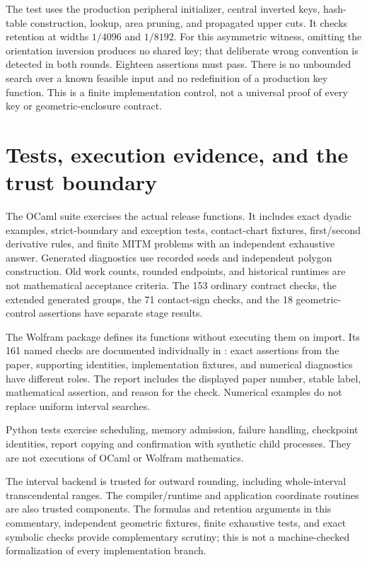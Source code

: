 \documentclass[11pt,a4paper]{article}
\newcommand{\code}[1]{\texttt{\detokenize{#1}}}
\theoremstyle{remark}\newtheorem*{contract}{Implementation contract}\newtheorem*{auditnote}{Audit note}
\begin{document}
The test uses the production peripheral initializer, central inverted
keys, hash-table construction, lookup, area pruning, and propagated
upper cuts. It checks retention at widths $1/4096$ and $1/8192$.
For this asymmetric witness, omitting the orientation inversion produces
no shared key; that deliberate wrong convention is detected in both
rounds. Eighteen assertions must pass. There is no unbounded search over
a known feasible input and no redefinition of a production key function.
This is a finite implementation control, not a universal proof of every
key or geometric-enclosure contract.

\section{Tests, execution evidence, and the trust boundary}

The OCaml suite exercises the actual release functions. It includes exact
dyadic examples, strict-boundary and exception tests, contact-chart fixtures,
first/second derivative rules, and finite MITM problems with an independent
exhaustive answer. Generated diagnostics use recorded seeds and independent
polygon construction. Old work counts, rounded endpoints, and historical
runtimes are not mathematical acceptance criteria. The 153 ordinary contract
checks, the extended generated groups, the 71 contact-sign checks, and
the 18 geometric-control assertions have separate stage results.

The Wolfram package defines its functions without executing them on import.
Its 161 named checks are documented individually in
\code{docs/WOLFRAM_CHECKS.md}: exact assertions from the paper, supporting
identities, implementation fixtures, and numerical diagnostics have different
roles. The report includes the displayed paper number, stable label,
mathematical assertion, and reason for the check. Numerical examples do not
replace uniform interval searches.

Python tests exercise scheduling, memory admission, failure handling,
checkpoint identities, report copying and confirmation with synthetic child
processes. They are not executions of OCaml or Wolfram mathematics.

The interval backend is trusted for outward rounding, including
whole-interval transcendental ranges. The compiler/runtime and application
coordinate routines are also trusted components. The formulas and retention
arguments in this commentary, independent geometric fixtures, finite
exhaustive tests, and exact symbolic checks provide complementary scrutiny;
this is not a machine-checked formalization of every implementation branch.
\end{document}
